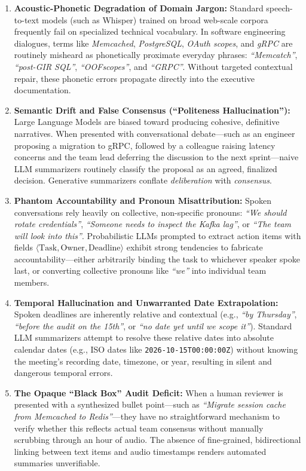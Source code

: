 \documentclass[10pt,a4paper]{article}
\begin{document}
\begin{enumerate}[label=\textbf{(\alph*)}]
    \item \textbf{Acoustic-Phonetic Degradation of Domain Jargon:} Standard speech-to-text models (such as Whisper) trained on broad web-scale corpora frequently fail on specialized technical vocabulary. In software engineering dialogues, terms like \textit{Memcached}, \textit{PostgreSQL}, \textit{OAuth scopes}, and \textit{gRPC} are routinely misheard as phonetically proximate everyday phrases: \textit{``Memcatch''}, \textit{``post-GIR SQL''}, \textit{``OOFscopes''}, and \textit{``GRPC''}. Without targeted contextual repair, these phonetic errors propagate directly into the executive documentation.
    
    \item \textbf{Semantic Drift and False Consensus (``Politeness Hallucination''):} Large Language Models are biased toward producing cohesive, definitive narratives. When presented with conversational debate—such as an engineer proposing a migration to gRPC, followed by a colleague raising latency concerns and the team lead deferring the discussion to the next sprint—naive LLM summarizers routinely classify the proposal as an agreed, finalized decision. Generative summarizers conflate \textit{deliberation} with \textit{consensus}.
    
    \item \textbf{Phantom Accountability and Pronoun Misattribution:} Spoken conversations rely heavily on collective, non-specific pronouns: \textit{``We should rotate credentials''}, \textit{``Someone needs to inspect the Kafka lag''}, or \textit{``The team will look into this''}. Probabilistic LLMs prompted to extract action items with fields $\langle \text{Task}, \text{Owner}, \text{Deadline} \rangle$ exhibit strong tendencies to fabricate accountability—either arbitrarily binding the task to whichever speaker spoke last, or converting collective pronouns like \textit{``we''} into individual team members.
    
    \item \textbf{Temporal Hallucination and Unwarranted Date Extrapolation:} Spoken deadlines are inherently relative and contextual (e.g., \textit{``by Thursday''}, \textit{``before the audit on the 15th''}, or \textit{``no date yet until we scope it''}). Standard LLM summarizers attempt to resolve these relative dates into absolute calendar dates (e.g., ISO dates like \texttt{2026-10-15T00:00:00Z}) without knowing the meeting's recording date, timezone, or year, resulting in silent and dangerous temporal errors.
    
    \item \textbf{The Opaque ``Black Box'' Audit Deficit:} When a human reviewer is presented with a synthesized bullet point—such as \textit{``Migrate session cache from Memcached to Redis''}—they have no straightforward mechanism to verify whether this reflects actual team consensus without manually scrubbing through an hour of audio. The absence of fine-grained, bidirectional linking between text items and audio timestamps renders automated summaries unverifiable.
\end{enumerate}
\end{document}
